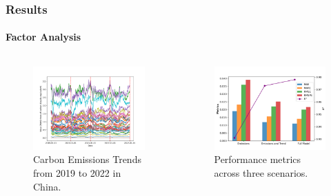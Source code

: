 \documentclass[light]{lutbeamer} %
\begin{document}
\begin{frame}
    \frametitle{Results}
    \framesubtitle{Factor Analysis}

    \begin{columns}[T] %

        \begin{column}{0.48\textwidth}
            \begin{figure}
                \centering
                \includegraphics[width=\textwidth]{figures/combined_trend_plot.png}
                \caption{Carbon Emissions Trends from 2019 to 2022 in China.}
            \end{figure}
        \end{column}

        \begin{column}{0.48\textwidth}
            \begin{figure}
                \centering
                \includegraphics[width=\textwidth]{figures/comparison_feature.png}
                \caption{Performance metrics across three scenarios.}
            \end{figure}
        \end{column}

    \end{columns}
\end{frame}
\end{document}

